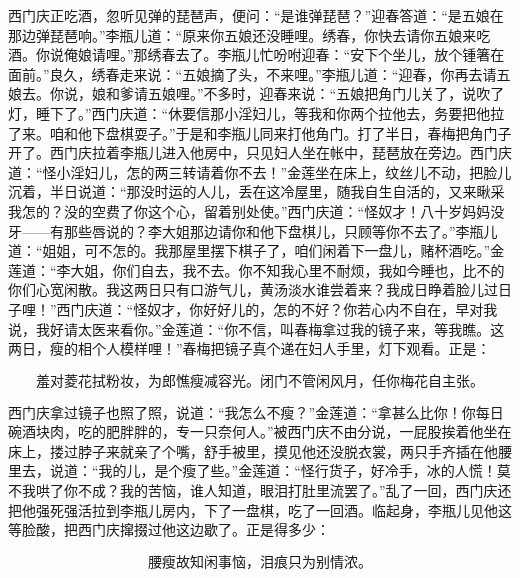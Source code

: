 西门庆正吃酒，忽听见弹的琵琶声，便问：“是谁弹琵琶？”迎春答道：“是五娘在那边弹琵琶响。”李瓶儿道：“原来你五娘还没睡哩。绣春，你快去请你五娘来吃酒。你说俺娘请哩。”那绣春去了。李瓶儿忙吩咐迎春：“安下个坐儿，放个锺箸在面前。”良久，绣春走来说：“五娘摘了头，不来哩。”李瓶儿道：“迎春，你再去请五娘去。你说，娘和爹请五娘哩。”不多时，迎春来说：“五娘把角门儿关了，说吹了灯，睡下了。”西门庆道：“休要信那小淫妇儿，等我和你两个拉他去，务要把他拉了来。咱和他下盘棋耍子。”于是和李瓶儿同来打他角门。打了半日，春梅把角门子开了。西门庆拉着李瓶儿进入他房中，只见妇人坐在帐中，琵琶放在旁边。西门庆道：“怪小淫妇儿，怎的两三转请着你不去！”金莲坐在床上，纹丝儿不动，把脸儿沉着，半日说道：“那没时运的人儿，丢在这冷屋里，随我自生自活的，又来瞅采我怎的？没的空费了你这个心，留着别处使。”西门庆道：“怪奴才！八十岁妈妈没牙——有那些唇说的？李大姐那边请你和他下盘棋儿，只顾等你不去了。”李瓶儿道：“姐姐，可不怎的。我那屋里摆下棋子了，咱们闲着下一盘儿，赌杯酒吃。”金莲道：“李大姐，你们自去，我不去。你不知我心里不耐烦，我如今睡也，比不的你们心宽闲散。我这两日只有口游气儿，黄汤淡水谁尝着来？我成日睁着脸儿过日子哩！”西门庆道：“怪奴才，你好好儿的，怎的不好？你若心内不自在，早对我说，我好请太医来看你。”金莲道：“你不信，叫春梅拿过我的镜子来，等我瞧。这两日，瘦的相个人模样哩！”春梅把镜子真个递在妇人手里，灯下观看。正是：

\[
羞对菱花拭粉妆，为郎憔瘦减容光。
闭门不管闲风月，任你梅花自主张。
\]

西门庆拿过镜子也照了照，说道：“我怎么不瘦？”金莲道：“拿甚么比你！你每日碗酒块肉，吃的肥胖胖的，专一只奈何人。”被西门庆不由分说，一屁股挨着他坐在床上，搂过脖子来就亲了个嘴，舒手被里，摸见他还没脱衣裳，两只手齐插在他腰里去，说道：“我的儿，是个瘦了些。”金莲道：“怪行货子，好冷手，冰的人慌！莫不我哄了你不成？我的苦恼，谁人知道，眼泪打肚里流罢了。”乱了一回，西门庆还把他强死强活拉到李瓶儿房内，下了一盘棋，吃了一回酒。临起身，李瓶儿见他这等脸酸，把西门庆撺掇过他这边歇了。正是得多少：

\[
腰瘦故知闲事恼，泪痕只为别情浓。
\]
